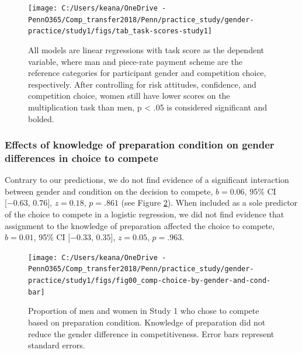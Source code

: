 \documentclass[a4paper, nobind]{templates/ociamthesis}
\begin{document}
\begin{figure}

{\centering \texttt{[image: C:/Users/keana/OneDrive - PennO365/Comp\_transfer2018/Penn/practice\_study/gender-practice/study1/figs/tab\_task-scores-study1]} 

}

\caption{All models are linear regressions with task score as the dependent variable, where man and piece-rate payment scheme are the reference categories for participant gender and competition choice, respectively. After controlling for risk attitudes, confidence, and competition choice, women still have lower scores on the multiplication task than men, p < .05 is considered significant and bolded.}\label{fig:tab-task-scores-study1}
\end{figure}

\hypertarget{effects-of-knowledge-of-preparation-condition-on-gender-differences-in-choice-to-compete}{%
\subsubsection{Effects of knowledge of preparation condition on gender differences in choice to compete}\label{effects-of-knowledge-of-preparation-condition-on-gender-differences-in-choice-to-compete}}

Contrary to our predictions, we do not find evidence of a significant interaction between gender and condition on the decision to compete, \(b = 0.06\), 95\% CI \([-0.63\), \(0.76]\), \(z = 0.18\), \(p = .861\) (see Figure \ref{fig:s100}). When included as a sole predictor of the choice to compete in a logistic regression, we did not find evidence that assignment to the knowledge of preparation affected the choice to compete, \(b = 0.01\), 95\% CI \([-0.33\), \(0.35]\), \(z = 0.05\), \(p = .963\).

\begin{figure}

{\centering \texttt{[image: C:/Users/keana/OneDrive - PennO365/Comp\_transfer2018/Penn/practice\_study/gender-practice/study1/figs/fig00\_comp-choice-by-gender-and-cond-bar]} 

}

\caption{Proportion of men and women in Study 1 who chose to compete based on preparation condition. Knowledge of preparation did not reduce the gender difference in competitiveness. Error bars represent standard errors.}\label{fig:s100}
\end{figure}
\end{document}
